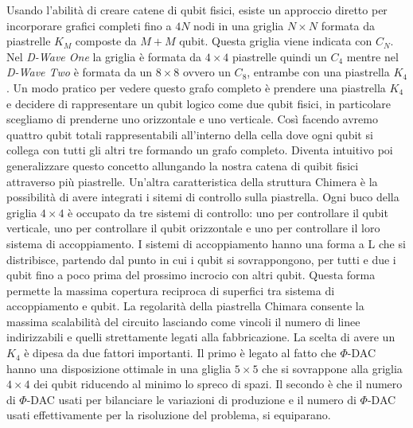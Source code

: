 Usando l'abilità di creare catene di qubit fisici, esiste un approccio diretto per incorporare grafici completi fino a $4N$ nodi in una griglia $N \times N$ formata da piastrelle $K_M$ composte da $M + M$ qubit. Questa griglia viene indicata con $C_N$. Nel \textit{D-Wave One} la griglia è formata da $4\times4$ piastrelle quindi un $C_4$ mentre nel \textit{D-Wave Two} è formata da un $8\times8$ ovvero un $C_8$, entrambe con una piastrella $K_4$. Un modo pratico per vedere questo grafo completo è prendere una piastrella $K_4$ e decidere di rappresentare un qubit logico come due qubit fisici, in particolare scegliamo di prenderne uno orizzontale e uno verticale. Così facendo avremo quattro qubit totali rappresentabili all'interno della cella dove ogni qubit si collega con tutti gli altri tre formando un grafo completo. Diventa intuitivo poi generalizzare questo concetto allungando la nostra catena di quibit fisici attraverso più piastrelle. Un'altra caratteristica della struttura Chimera è la possibilità di avere integrati i sitemi di controllo sulla piastrella. Ogni buco della griglia $4\times4$ è occupato da tre sistemi di controllo: uno per controllare il qubit verticale, uno per controllare il qubit orizzontale e uno per controllare il loro sistema di accoppiamento. I sistemi di accoppiamento hanno una forma a L che si distribisce, partendo dal punto in cui i qubit si sovrappongono, per tutti e due i qubit fino a poco prima del prossimo incrocio con altri qubit. Questa forma permette la massima copertura reciproca di superfici tra sistema di accoppiamento e qubit.
La regolarità della piastrella Chimara consente la massima scalabilità del circuito lasciando come vincoli il numero di linee indirizzabili e quelli strettamente legati alla fabbricazione. La scelta di avere un $K_4$ è dipesa da due fattori importanti. Il primo è legato al fatto che $\Phi$-DAC hanno una disposizione ottimale in una gliglia $5\times5$ che si sovrappone alla griglia $4\times4$ dei qubit riducendo al minimo lo spreco di spazi. Il secondo è che il numero di $\Phi$-DAC usati per bilanciare le variazioni di produzione e il numero di $\Phi$-DAC usati effettivamente per la risoluzione del problema, si equiparano.

